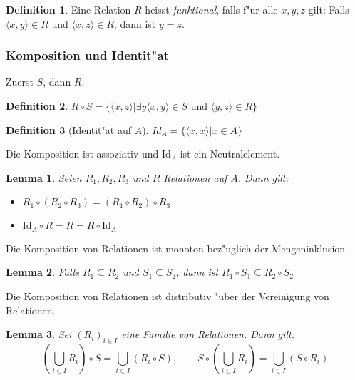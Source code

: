 \documentclass[german,10pt, a4paper, twocolumn]{scrartcl}
\newtheorem{lemma}{Lemma}[section]
\theoremstyle{definition}
\newtheorem{definition}{Definition}[section]
\theoremstyle{remark}
\begin{document}
\begin{definition}
	Eine Relation $R$ heisst \textit{funktional}, falls f"ur alle $x,y,z$ gilt: Falls $\langle x,y \rangle\in R$ und $\langle x,z\rangle \in R$, dann ist $y=z$.
\end{definition}

\subsubsection{Komposition und Identit"at}

Zuerst $S$, dann $R$.
\begin{definition}
	$R\circ S = \{ \langle x, z \rangle | \exists y \langle x,y \rangle \in S \mbox{ und } \langle y,z \rangle \in R \}$
\end{definition}

\begin{definition}[Identit"at auf $A$]
	$Id_A = \{ \langle x,x \rangle | x\in A \}$
\end{definition}

Die Komposition ist assoziativ und $\mbox{Id}_A$ ist ein Neutralelement.

\begin{lemma}
	Seien $R_1,R_2,R_3$ und $R$ Relationen auf $A$. Dann gilt:
	\begin{itemize}
		\item $R_1 \circ (R_2 \circ R_3) = (R_1\circ R_2)\circ R_3$
		\item $\mbox{Id}_A \circ R=R=R\circ \mbox{Id}_A$
	\end{itemize}
\end{lemma}

Die Komposition von Relationen ist monoton bez"uglich der Mengeninklusion.

\begin{lemma}
	Falls $R_1\subseteq R_2$ und $S_1 \subseteq S_2$, dann ist $R_1 \circ S_1 \subseteq R_2 \circ S_2$
\end{lemma}

Die Komposition von Relationen ist distributiv "uber der Vereinigung von Relationen.
\begin{lemma}
	Sei $(R_i)_{i\in I}$ eine Familie von Relationen. Dann gilt:
	\begin{displaymath}
		( \bigcup_{i\in I} R_i ) \circ S = \bigcup_{i\in I} (R_i \circ S), \qquad S\circ(\bigcup_{i\in I} R_i) = \bigcup_{i \in I}(S\circ R_i)
	\end{displaymath}
\end{lemma}
\end{document}
